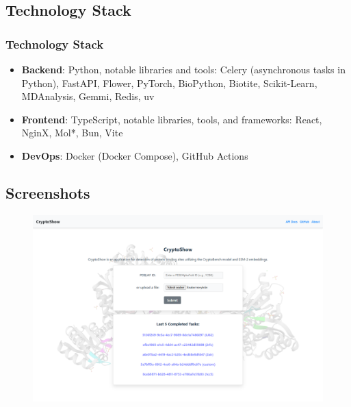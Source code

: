 \documentclass[aspectratio=169]{beamer}
\begin{document}
\subsection{Technology Stack}

\begin{frame}
  \frametitle{Technology Stack}

  \begin{itemize}
    \item \textbf{Backend}: Python, notable libraries and tools: Celery (asynchronous tasks in Python), FastAPI, Flower, PyTorch, BioPython, Biotite, Scikit-Learn, MDAnalysis, Gemmi, Redis, uv
    \item \textbf{Frontend}: TypeScript, notable libraries, tools, and frameworks: React, NginX, Mol*, Bun, Vite
    \item \textbf{DevOps}: Docker (Docker Compose), GitHub Actions
  \end{itemize}

\end{frame}

\subsection{Screenshots}

\begin{frame}
  \begin{figure}
    \centering
    \includegraphics[width=\linewidth,height=\textheight,keepaspectratio]{fig/screen1.png}
  \end{figure}

\end{frame}
\end{document}
